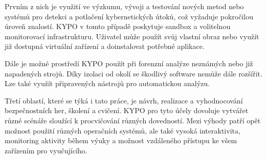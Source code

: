 \documentclass[
  digital, %
  oneside, %
  table,   %
  nolof,     %
  nolot,     %
]{fithesis3}
\begin{document}
Prvním z nich je využití ve výzkumu, vývoji a testování nových metod nebo systémů pro detekci a potlačení kybernetických útoků, což vyžaduje pokročilou úroveň znalostí. KYPO v tomto případě poskytuje sandbox a volitelnou monitorovací infrastrukturu. Uživatel může použít svůj vlastní obraz nebo využít již dostupná virtuální zařízení a doinstalovat potřebné aplikace. \cite{kypo2017}\par
Dále je možné prostředí KYPO použít při forenzní analýze neznámých nebo již napadených strojů. Díky izolaci od okolí se škodlivý software nemůže dále rozšířit. Lze také využít připravených nástrojů pro automatickou analýzu. \cite{lessons2015, kypo2017}\par
Třetí oblastí, které se týká i tato práce, je návrh, realizace a vyhodnocování bezpečnostních her, školení a cvičení. KYPO pro tyto účely dovoluje vytvářet různé scénáře sloužící k procvičování různých dovedností. Mezi výhody patří opět možnost použití různých operačních systémů, ale také vysoká interaktivita, monitoring aktivity během výuky a možnost vzdáleného přístupu ke všem zařízením pro vyučujícího. \cite{lessons2015, kypocz}
\end{document}
